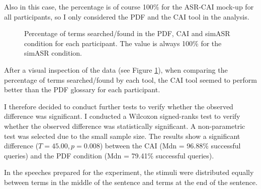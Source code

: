 Also in this case, the percentage is of course 100\% for the ASR-CAI mock-up for all participants, so I only considered the PDF and the CAI tool in the analysis.

\begin{figure}
\caption[Percentage of terms searched/found]{Percentage of terms searched/found  in the PDF, CAI and simASR condition for each participant. The value is always 100\% for the simASR condition.}
\label{fig:termsfound}
\end{figure}

After a visual inspection of the data (see Figure \ref{fig:termsfound}), when comparing the percentage of terms searched/found by each tool, the CAI tool seemed to perform better than the PDF glossary for each participant.

I therefore decided to conduct further tests to verify whether the observed difference was significant. I conducted a Wilcoxon signed-ranks test to verify whether the observed difference was statistically significant. A non-parametric test was selected due to the small sample size. The results show a significant difference ($T = 45.00, p = 0.008$) between the CAI (Mdn = 96.88\% successful queries) and the PDF condition (Mdn = 79.41\% successful queries).

 \label{terms_searched_position}
In the speeches prepared for the experiment, the stimuli were distributed equally between terms in the middle of the sentence and terms at the end of the sentence.

